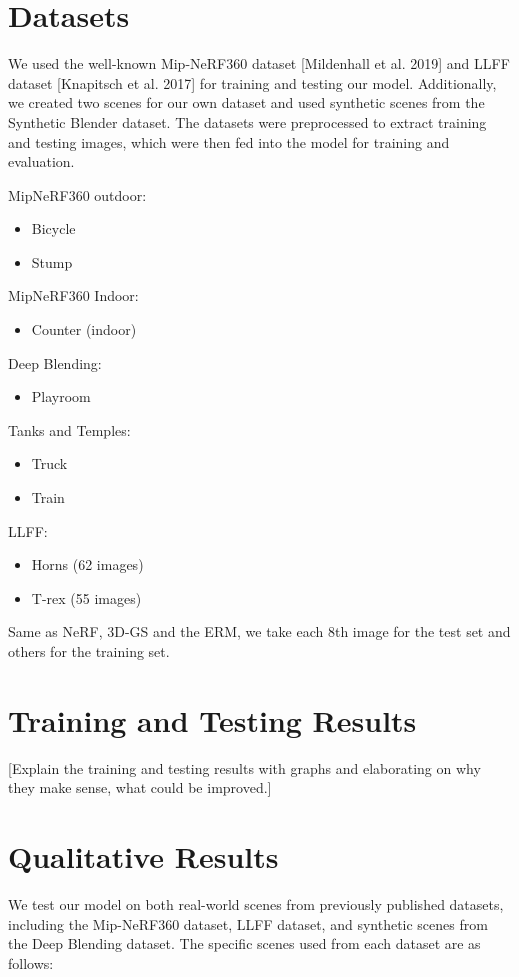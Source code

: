 \documentclass[11pt]{report}
\begin{document}
\section{Datasets}
We used the well-known Mip-NeRF360 dataset [Mildenhall et al. 2019] and LLFF dataset [Knapitsch et al. 2017] for training and testing our model. Additionally, we created two scenes for our own dataset and used synthetic scenes from the Synthetic Blender dataset. The datasets were preprocessed to extract training and testing images, which were then fed into the model for training and evaluation.

MipNeRF360 outdoor:
\begin{itemize}
    \item Bicycle 
    \item Stump
\end{itemize}

MipNeRF360 Indoor:
\begin{itemize}
    \item Counter (indoor)
\end{itemize}

Deep Blending:
\begin{itemize}
    \item Playroom
\end{itemize}

Tanks and Temples:
\begin{itemize}
    \item Truck
    \item Train
\end{itemize}

LLFF:
\begin{itemize}
    \item Horns (62 images)
    \item T-rex (55 images)
\end{itemize}

Same as NeRF, 3D-GS and the ERM, we take each 8th image for the test set and others for the training set.

\section{Training and Testing Results}
[Explain the training and testing results with graphs and elaborating on why they make sense, what could be improved.]

\section{Qualitative Results}
We test our model on both real-world scenes from previously published datasets, including the Mip-NeRF360 dataset, LLFF dataset, and synthetic scenes from the Deep Blending dataset. The specific scenes used from each dataset are as follows: 
\end{document}
